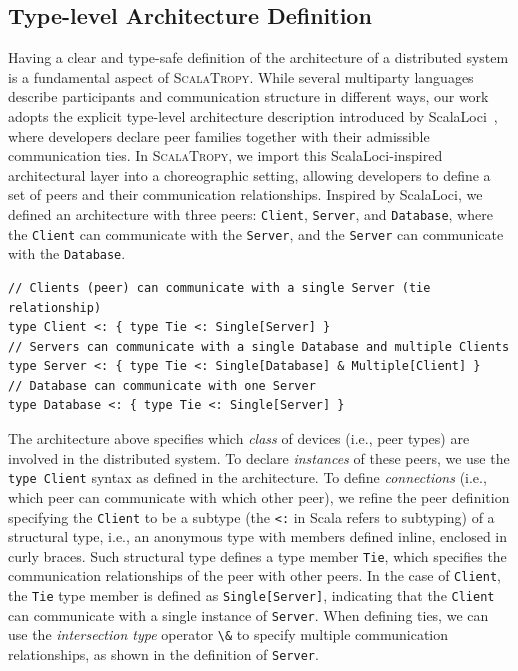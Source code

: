 \documentclass[runningheads]{llncs}
\newcommand{\ourLang}{\textsc{ScalaTropy}}
\newcommand{\code}[1]{\lstinline[style=scala3,basicstyle=\ttfamily\small\color{vscLightText}]{#1}}
\newcommand{\diff}[1]{{#1}}
\begin{document}
\subsection{Type-level Architecture Definition}\label{sec:arch-def}
Having a clear and type-safe definition of the architecture of a distributed system is a fundamental aspect of \ourLang{}.
%
\diff{While several multiparty languages describe participants and communication structure in different ways,
our work adopts the explicit type-level architecture description introduced by ScalaLoci~\cite{DBLP:journals/pacmpl/WeisenburgerKS18},
where developers declare peer families together with their admissible communication ties.}
%
In \ourLang{},
\diff{we import this ScalaLoci-inspired architectural layer into a choreographic setting,}
allowing developers to define a set of peers and their communication relationships.
%
Inspired by ScalaLoci,
we defined an architecture with three peers: \texttt{Client}, \texttt{Server}, and \texttt{Database},
where the \texttt{Client} can communicate with the \texttt{Server},
and the \texttt{Server} can communicate with the \texttt{Database}.
%
\begin{lstlisting}[style=scala3]
// Clients (peer) can communicate with a single Server (tie relationship)
type Client <: { type Tie <: Single[Server] }
// Servers can communicate with a single Database and multiple Clients
type Server <: { type Tie <: Single[Database] & Multiple[Client] }
// Database can communicate with one Server
type Database <: { type Tie <: Single[Server] }
\end{lstlisting}
The architecture above specifies which \emph{class} of devices (i.e., peer types) are involved in the distributed system.
%
To declare \emph{instances} of these peers,
we use the \code{type Client} syntax as defined in the architecture.
%
To define \emph{connections} (i.e., which peer can communicate with which other peer),
we refine the peer definition specifying the \code{Client} to be a subtype (the \code{<:} in Scala refers to subtyping) of a structural type, i.e., an anonymous type with members defined inline,
enclosed in curly braces.
%
Such structural type defines a type member \code{Tie},
which specifies the communication relationships of the peer with other peers.
%
In the case of \code{Client},
the \code{Tie} type member is defined as \code{Single[Server]},
indicating that the \code{Client} can communicate with a single instance of \code{Server}.
%
When defining ties,
we can use the \emph{intersection type} operator \code{\&} to specify multiple communication relationships,
as shown in the definition of \code{Server}.
\end{document}
